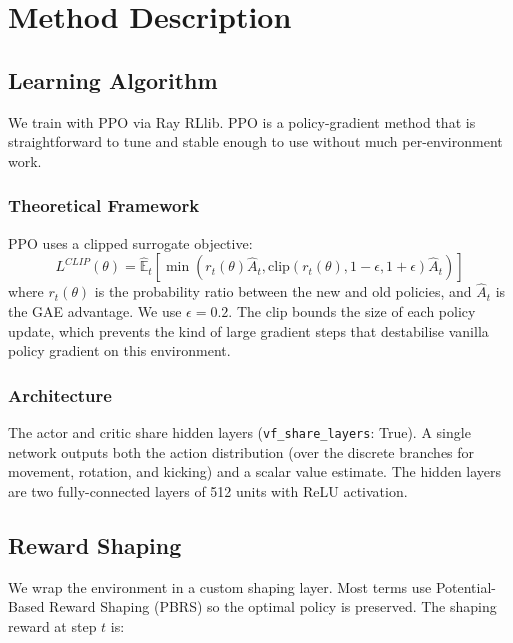 \documentclass{article}
\begin{document}

\section{Method Description}
\label{sec:method}

\subsection{Learning Algorithm}

We train with PPO \cite{schulman2017proximal} via Ray RLlib. PPO is a policy-gradient method that is straightforward to tune and stable enough to use without much per-environment work.

\subsubsection{Theoretical Framework}

PPO uses a clipped surrogate objective:
$$L^{CLIP}(\theta) = \hat{\mathbb{E}}_t \left[ \min(r_t(\theta) \hat{A}_t, \text{clip}(r_t(\theta), 1 - \epsilon, 1 + \epsilon) \hat{A}_t) \right]$$
where $r_t(\theta)$ is the probability ratio between the new and old policies, and $\hat{A}_t$ is the GAE advantage. We use $\epsilon = 0.2$. The clip bounds the size of each policy update, which prevents the kind of large gradient steps that destabilise vanilla policy gradient on this environment.

\subsubsection{Architecture}

The actor and critic share hidden layers (\texttt{vf\_share\_layers}: True). A single network outputs both the action distribution (over the discrete branches for movement, rotation, and kicking) and a scalar value estimate. The hidden layers are two fully-connected layers of 512 units with ReLU activation.

\subsection{Reward Shaping}

We wrap the environment in a custom shaping layer. Most terms use Potential-Based Reward Shaping (PBRS) \cite{ng1999policy} so the optimal policy is preserved. The shaping reward at step $t$ is:
\end{document}
